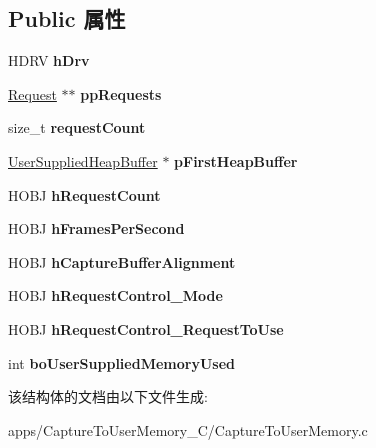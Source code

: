 \subsection*{Public 属性}
\begin{DoxyCompactItemize}
\item 
\hypertarget{struct___capture_parameter_a1e2b007b33ef9f446c3ba53f7457f6f3}{H\+D\+R\+V {\bfseries h\+Drv}}\label{struct___capture_parameter_a1e2b007b33ef9f446c3ba53f7457f6f3}

\item 
\hypertarget{struct___capture_parameter_a4161c94b5a9eebd824ca2778d17725dd}{\hyperlink{struct___request}{Request} $\ast$$\ast$ {\bfseries pp\+Requests}}\label{struct___capture_parameter_a4161c94b5a9eebd824ca2778d17725dd}

\item 
\hypertarget{struct___capture_parameter_a060e4e9d724614ff7afed7f02a0413ff}{size\+\_\+t {\bfseries request\+Count}}\label{struct___capture_parameter_a060e4e9d724614ff7afed7f02a0413ff}

\item 
\hypertarget{struct___capture_parameter_a5be7908b9c2594dfe614035d4df31cf2}{\hyperlink{class_user_supplied_heap_buffer}{User\+Supplied\+Heap\+Buffer} $\ast$ {\bfseries p\+First\+Heap\+Buffer}}\label{struct___capture_parameter_a5be7908b9c2594dfe614035d4df31cf2}

\item 
\hypertarget{struct___capture_parameter_a19e86f503947707e7b59dcc9391025b5}{H\+O\+B\+J {\bfseries h\+Request\+Count}}\label{struct___capture_parameter_a19e86f503947707e7b59dcc9391025b5}

\item 
\hypertarget{struct___capture_parameter_a36af8b92a7dad7cd7b6390aadf24dd7e}{H\+O\+B\+J {\bfseries h\+Frames\+Per\+Second}}\label{struct___capture_parameter_a36af8b92a7dad7cd7b6390aadf24dd7e}

\item 
\hypertarget{struct___capture_parameter_ab9cba463e831cf2e10b3ae9575112c8e}{H\+O\+B\+J {\bfseries h\+Capture\+Buffer\+Alignment}}\label{struct___capture_parameter_ab9cba463e831cf2e10b3ae9575112c8e}

\item 
\hypertarget{struct___capture_parameter_aa707da92ac521a31e90be5bdb379ed57}{H\+O\+B\+J {\bfseries h\+Request\+Control\+\_\+\+Mode}}\label{struct___capture_parameter_aa707da92ac521a31e90be5bdb379ed57}

\item 
\hypertarget{struct___capture_parameter_a213d6325b88244dcbdf33f7901c8d47d}{H\+O\+B\+J {\bfseries h\+Request\+Control\+\_\+\+Request\+To\+Use}}\label{struct___capture_parameter_a213d6325b88244dcbdf33f7901c8d47d}

\item 
\hypertarget{struct___capture_parameter_a8aa8389036748c7a40bc680631dff40b}{int {\bfseries bo\+User\+Supplied\+Memory\+Used}}\label{struct___capture_parameter_a8aa8389036748c7a40bc680631dff40b}

\end{DoxyCompactItemize}


该结构体的文档由以下文件生成\+:\begin{DoxyCompactItemize}
\item 
apps/\+Capture\+To\+User\+Memory\+\_\+\+C/Capture\+To\+User\+Memory.\+c\end{DoxyCompactItemize}
